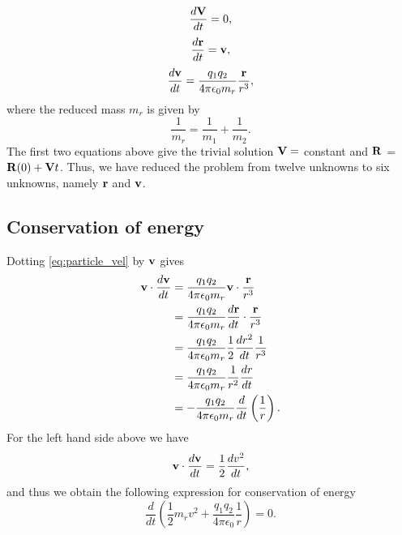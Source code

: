 \documentclass[oneside,a4paper,11pt]{report}
\begin{document}
\begin{equation}
    \frac{d \mathbf{V}}{dt} = 0 ,
\end{equation}
\begin{equation}
    \label{eq:particle_pos}
    \frac{d \mathbf{r}}{dt} = \mathbf{v},
\end{equation}
\begin{equation}
    \label{eq:particle_vel}
    \frac{d \mathbf{v}}{dt} = \frac{q_1 q_2}{4\pi \epsilon_0 m_r} \frac{\mathbf{r}}{r^3},
\end{equation}
where the reduced mass $m_r$ is given by
\begin{equation}
    \frac{1}{m_r} = \frac{1}{m_1} + \frac{1}{m_2}.
\end{equation}
The first two equations above give the trivial solution $\mathbf{V} = $ constant and $\mathbf{R}$ = $\mathbf{R}(0) + \mathbf{V} t$. Thus, we have reduced the problem from twelve unknowns to six unknowns, namely $\mathbf{r}$ and $\mathbf{v}$.

\subsection{Conservation of energy}
Dotting \cref{eq:particle_vel} by $\mathbf{v}$ gives 
\begin{align}
    \mathbf{v} \cdot \frac{d \mathbf{v}}{dt} &= \frac{q_1 q_2}{4 \pi \epsilon_0 m_r} \mathbf{v} \cdot \frac{\mathbf{r}}{r^3} \nonumber \\
    &= \frac{q_1 q_2}{4 \pi \epsilon_0 m_r} \frac{d\mathbf{r}}{dt} \cdot \frac{\mathbf{r}}{r^3} \nonumber \\
    &= \frac{q_1 q_2}{4 \pi \epsilon_0 m_r} \frac{1}{2} \frac{dr^2}{dt} \frac{1}{r^3} \nonumber \\
    &= \frac{q_1 q_2}{4 \pi \epsilon_0 m_r} \frac{1}{r^2} \frac{dr}{dt} \nonumber \\
    &= -\frac{q_1 q_2}{4 \pi \epsilon_0 m_r} \frac{d}{dt} \left ( \frac{1}{r} \right ).
\end{align} 
For the left hand side above we have
\begin{equation}
    \mathbf{v} \cdot \frac{d \mathbf{v}}{dt} = \frac{1}{2} \frac{d v^2}{dt},
\end{equation}
and thus we obtain the following expression for conservation of energy
\begin{equation}
    \frac{d}{dt} \left ( \frac{1}{2} m_r v^2 + \frac{q_1 q_2}{4 \pi \epsilon_0} \frac{1}{r} \right ) = 0.
\end{equation}
\end{document}
